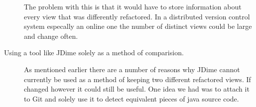 \begin{description}
    The problem with this is that it would have to store information about every view that was differently refactored.  In a distributed version control system especally an online one the number of distinct views could be large and change often.   
  \item [Using a tool like JDime solely as a method of comparision.]
    As mentioned earlier there are a number of reasons why JDime cannot currently be used as a method of keeping two different refactored views. If changed however it could still be useful.  One idea we had was to attach it to Git and solely use it to detect equivalent pieces of java source code.
\end{description}


